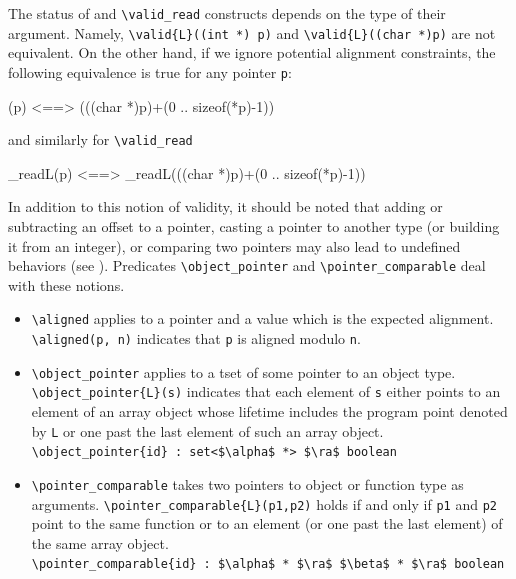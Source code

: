 The status of \valid and \lstinline|\valid_read| constructs depends on the
type of their argument. Namely, \lstinline|\valid{L}((int *) p)| and
\lstinline|\valid{L}((char *)p)| are not equivalent. On the other hand, if we
ignore potential alignment constraints, the following equivalence is true for
any pointer \lstinline|p|:
\begin{listing-nonumber}
(p) <==> (((char *)p)+(0 .. sizeof(*p)-1))
\end{listing-nonumber}
and similarly for \lstinline|\valid_read|
\begin{listing-nonumber}
\valid_read{L}(p) <==> \valid_read{L}(((char *)p)+(0 .. sizeof(*p)-1))
\end{listing-nonumber}

In addition to this notion of validity, it should be noted that
adding or subtracting an offset to a pointer, casting a pointer to another type
(or building it from an integer), or comparing two pointers may also lead to
undefined behaviors (see \cite[6.3.2, 6.5.6 and 6.5.8]{standardc99}).
Predicates \lstinline|\object_pointer| and \lstinline|\pointer_comparable|
deal with these notions.
\begin{itemize}
\item \lstinline|\aligned| applies to a pointer and a value
which is the expected alignment. \lstinline{\aligned(p, n)} indicates that
\lstinline|p| is aligned modulo \lstinline{n}.
\item \lstinline|\object_pointer| applies to a tset of
some pointer to an object type. \lstinline|\object_pointer{L}(s)| indicates that
each element of \lstinline|s| either points to an element of an array object
whose lifetime includes the program point denoted by \lstinline|L| or one past
the last element of such an array object.
\\ \makebox[5mm]{} \lstinline|\object_pointer{id} : set<$\alpha$ *> $\ra$ boolean|
\item \lstinline|\pointer_comparable| takes two pointers
to object or function type as arguments.
\lstinline|\pointer_comparable{L}(p1,p2)| holds if and only if \lstinline|p1|
and \lstinline|p2| point to the same function or to an element (or one past
the last element) of the same array object.
\\ \makebox[5mm]{} \lstinline|\pointer_comparable{id} : $\alpha$ * $\ra$ $\beta$ * $\ra$ boolean|
\end{itemize}

